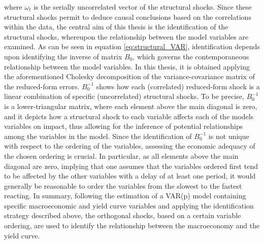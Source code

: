 where $\omega_{t}$ is the serially uncorrelated vector of the structural shocks.
Since these structural shocks permit to deduce causal conclusions based on the correlations within the data, the central aim of this thesis is the identification of the structural shocks, whereupon the relationship between the model variables are examined. 
As can be seen in equation \ref{eq:structural_VAR}, identification depends upon identifying the inverse of matrix $B_{0}$, which governs the contemporaneous relationship between the model variables.
In this thesis, it is obtained applying the aforementioned Cholesky decomposition of the variance-covariance matrix of the reduced-form errors. 
$B^{-1}_{0}$ shows how each (correlated) reduced-form shock is a linear combination of specific (uncorrelated) structural shocks. 
To be precise, $B^{-1}_{0}$ is a lower-triangular matrix, where each element above the main diagonal is zero, and it depicts how a structural shock to each variable affects each of the models variables on impact, thus allowing for the inference of potential relationships among the variables in the model. 
Since the identification of $B^{-1}_{0}$ is not unique with respect to the ordering of the variables, assessing the economic adequacy of the chosen ordering is crucial. 
In particular, as all elements above the main diagonal are zero, implying that one assumes that the variables ordered first tend to be affected by the other variables with a delay of at least one period, it would generally be reasonable to order the variables from the slowest to the fastest reacting. 
In summary, following the estimation of a VAR(p) model containing specific macroeconomic and yield curve variables and applying the identification strategy described above, the orthogonal shocks, based on a certain variable ordering, are used to identify the relationship between the macroeconomy and the yield curve. 



